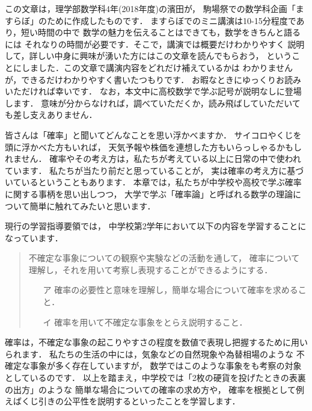 \documentclass[./main]{subfiles} %
\theoremstyle{definition}
\begin{document}



この文章は，理学部数学科4年(2018年度)の濱田が，
駒場祭での数学科企画「ますらぼ」のために作成したものです．
ますらぼでのミニ講演は10-15分程度であり，短い時間の中で
数学の魅力を伝えることはできても，数学をきちんと語るには
それなりの時間が必要です．そこで，講演では概要だけわかりやすく
説明して，詳しい中身に興味が湧いた方にはこの文章を読んでもらおう，
ということにしました．この文章で講演内容をどれだけ補えているかは
わかりませんが，できるだけわかりやすく書いたつもりです．
お暇なときにゆっくりお読みいただければ幸いです．
なお，本文中に高校数学で学ぶ記号が説明なしに登場します．
意味が分からなければ，調べていただくか，読み飛ばしていただいても差し支えありません．


皆さんは「確率」と聞いてどんなことを思い浮かべますか．
サイコロやくじを頭に浮かべた方もいれば，
天気予報や株価を連想した方もいらっしゃるかもしれません．
確率やその考え方は，私たちが考えている以上に日常の中で使われています．
私たちが当たり前だと思っていることが，
実は確率の考え方に基づいているということもあります．
本章では，私たちが中学校や高校で学ぶ確率に関する事柄を思い出しつつ，
大学で学ぶ「確率論」と呼ばれる数学の理論について簡単に触れてみたいと思います．


現行の学習指導要領では，
中学校第2学年において以下の内容を学習することになっています．
\begin{quote}
不確定な事象についての観察や実験などの活動を通して，
確率について理解し，それを用いて考察し表現することができるようにする．
\begin{itemize}
\item[ア]確率の必要性と意味を理解し，簡単な場合について確率を求めること．
\item[イ]確率を用いて不確定な事象をとらえ説明すること．
\end{itemize}
\end{quote}
確率は，不確定な事象の起こりやすさの程度を数値で表現し把握するために用いられます．
私たちの生活の中には，気象などの自然現象や為替相場のような
不確定な事象が多く存在していますが，
数学ではこのような事象をも考察の対象としているのです．
以上を踏まえ，中学校では「2枚の硬貨を投げたときの表裏の出方」のような
簡単な場合についての確率の求め方や，
確率を根拠として例えばくじ引きの公平性を説明するといったことを学習します．
\end{document}
